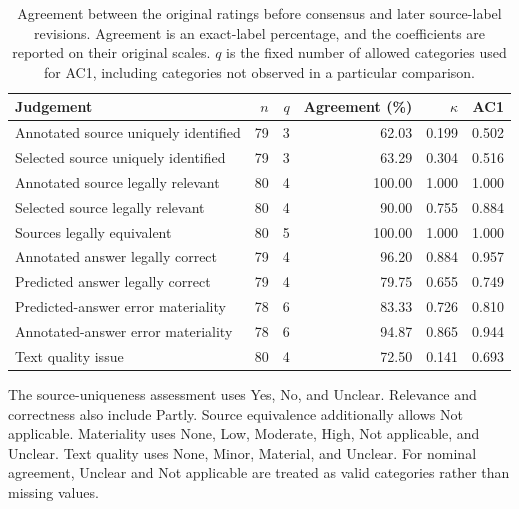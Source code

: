 \documentclass[pdflatex,sn-basic]{sn-jnl}%
\theoremstyle{thmstyleone}%
\theoremstyle{thmstyletwo}%
\theoremstyle{thmstylethree}%
\begin{document}
\begin{table}[!htbp]
    \caption{Agreement between the original ratings before consensus and later
    source-label revisions. Agreement is an exact-label percentage, and the
    coefficients are reported on their original scales. $q$ is the fixed
    number of allowed categories used for AC1, including categories not
    observed in a particular comparison.}
    \label{tab:human_agreement}
    \centering
    \scriptsize
    \setlength{\tabcolsep}{5pt}
    \begin{tabular}{@{}>{\raggedright\arraybackslash}p{5.3cm}rrrrr@{}}
        \toprule
        Judgement & $n$ & $q$ & Agreement (\%) & $\kappa$ & AC1 \\
        \midrule
        Annotated source uniquely identified
        & 79 & 3 & 62.03 & 0.199 & 0.502 \\

        Selected source uniquely identified
        & 79 & 3 & 63.29 & 0.304 & 0.516 \\

        Annotated source legally relevant
        & 80 & 4 & 100.00 & 1.000 & 1.000 \\

        Selected source legally relevant
        & 80 & 4 & 90.00 & 0.755 & 0.884 \\

        Sources legally equivalent
        & 80 & 5 & 100.00 & 1.000 & 1.000 \\

        Annotated answer legally correct
        & 79 & 4 & 96.20 & 0.884 & 0.957 \\

        Predicted answer legally correct
        & 79 & 4 & 79.75 & 0.655 & 0.749 \\

        Predicted-answer error materiality
        & 78 & 6 & 83.33 & 0.726 & 0.810 \\

        Annotated-answer error materiality
        & 78 & 6 & 94.87 & 0.865 & 0.944 \\

        Text quality issue
        & 80 & 4 & 72.50 & 0.141 & 0.693 \\
        \bottomrule
    \end{tabular}
\end{table}

The source-uniqueness assessment uses Yes, No, and Unclear. Relevance and
correctness also include Partly. Source equivalence additionally allows Not
applicable. Materiality uses None, Low, Moderate, High, Not applicable, and
Unclear. Text quality uses None, Minor, Material, and Unclear. For nominal
agreement, Unclear and Not applicable are treated as valid categories rather
than missing values.
\end{document}
